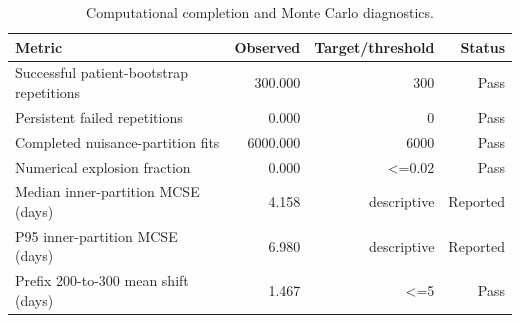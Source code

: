 \begin{table}[htbp]
\centering
\caption{Computational completion and Monte Carlo diagnostics.}
\label{tab:computational_reproducibility}
\small
\begin{tabular}{lrrr}
\toprule
Metric & Observed & Target/threshold & Status \\
\midrule
Successful patient-bootstrap repetitions & 300.000 & 300 & Pass \\
Persistent failed repetitions & 0.000 & 0 & Pass \\
Completed nuisance-partition fits & 6000.000 & 6000 & Pass \\
Numerical explosion fraction & 0.000 & <=0.02 & Pass \\
Median inner-partition MCSE (days) & 4.158 & descriptive & Reported \\
P95 inner-partition MCSE (days) & 6.980 & descriptive & Reported \\
Prefix 200-to-300 mean shift (days) & 1.467 & <=5 & Pass \\
\bottomrule
\end{tabular}
\par\vspace{2pt}{\footnotesize The estimator and bootstrap configuration were cryptographically locked before the 300-repetition analysis.}
\end{table}
